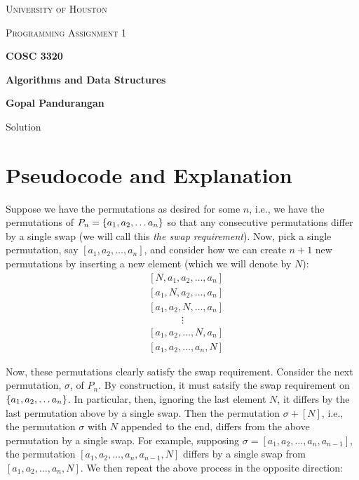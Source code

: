 \documentclass[final]{article}
\begin{document}
\begin{titlepage}
    \begin{center}
        {\scshape\LARGE University of Houston\par}
        \vspace{1cm}
        {\scshape\Large Programming Assignment 1 \par}
        \vspace{1.5cm}
        {\huge\bfseries COSC 3320 \par}
        {\huge\bfseries Algorithms and Data Structures \par}
        \vspace{0.5cm}
        {\large\bfseries Gopal Pandurangan\par}
        \vspace{2cm}
        {\Large Solution\par}
    \end{center}
\end{titlepage}



\section{Pseudocode and Explanation}
Suppose we have the permutations as desired for some $n$, i.e., we have the permutations of $P_n = \left\lbrace a_1, a_2, \dots a_n\right\rbrace$ so that any consecutive permutations differ by a single swap (we will call this \emph{the swap requirement}). Now, pick a single permutation, say $[a_1, a_2, \dots, a_n]$, and consider how we can create $n + 1$ new permutations by inserting a new element (which we will denote by $N$):
\begin{align*}
     & [N, a_1, a_2, \dots, a_n]      \\
     & [a_1, N, a_2, \dots, a_n]      \\
     & [a_1, a_2, N, \dots, a_n]      \\
     & \phantom{............}  \vdots \\
     & [a_1, a_2, \dots, N, a_n]      \\
     & [a_1, a_2, \dots, a_n, N]
\end{align*}

Now, these permutations clearly satisfy the swap requirement. Consider the next permutation, $\sigma$, of $P_n$. By construction, it must satsify the swap requirement on $\left\lbrace a_1, a_2, \dots a_n\right\rbrace$. In particular, then, ignoring the last element $N$, it differs by the last permutation above by a single swap. Then the permutation $\sigma + [N]$, i.e., the permutation $\sigma$ with $N$ appended to the end, differs from the above permutation by a single swap. For example, supposing $\sigma = [a_1, a_2, \dots, a_n, a_{n-1}]$, the permutation $[a_1, a_2, \dots, a_n, a_{n-1}, N]$ differs by a single swap from $[a_1, a_2, \dots, a_n, N]$. We then repeat the above process in the opposite direction:
\end{document}
